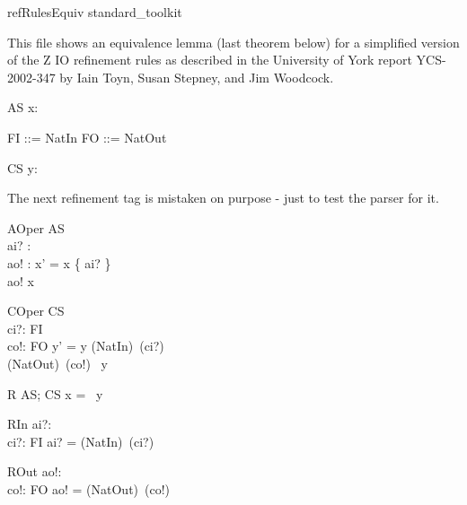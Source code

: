 \begin{zsection}
   \SECTION refRulesEquiv \parents standard\_toolkit
\end{zsection}

This file shows an equivalence lemma (last theorem below) for a simplified
version of the Z IO refinement rules as described in the University of York
report YCS-2002-347 by Iain Toyn, Susan Stepney, and Jim Woodcock.

\begin{schema}{AS}
   x: \power~\nat
\end{schema}
\begin{zed}
   FI ::= NatIn \ldata \nat \rdata
 \also
   FO ::= NatOut \ldata \nat \rdata
\end{zed}

\begin{schema}{CS}
   y: \seq~\nat
\end{schema}

The next refinement tag is mistaken on purpose - just to test the parser for it.
\begin{schema}{AOper}
   \Delta AS\\
   ai? : \nat\\
   ao! : \nat
\where
   x' = x \cup \{ ai? \}
   \\
   ao! \in x
\end{schema}

\begin{schema}{COper}
   \Delta CS \\
   ci?: FI \\
   co!: FO
\where
   y' = y \cat \langle (NatIn\inv)~(ci?) \rangle \\
   (NatOut\inv)~(co!) \in \ran~y
\end{schema}

\begin{schema}{R}
   AS; CS
\where
   x = \ran~y
\end{schema}

\begin{schema}{RIn}
   ai?: \nat \\
   ci?: FI
\where
   ai? = (NatIn\inv)~(ci?)
\end{schema}

\begin{schema}{ROut}
   ao!: \nat \\
   co!: FO
\where
   ao! = (NatOut\inv)~(co!)
\end{schema}

